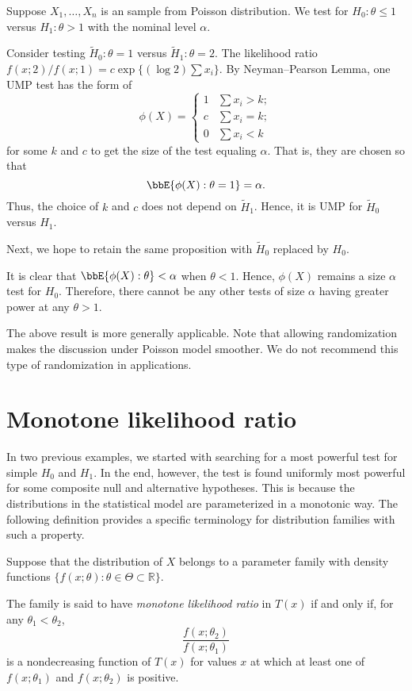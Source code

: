 \begin{example}
Suppose $X_1, \ldots, X_n$ is an \iid sample from
Poisson distribution. We test for $H_0: \theta \leq 1$ versus $H_1: \theta > 1$
with the nominal level $\alpha$.

Consider testing $\tilde H_0: \theta = 1$ versus $\tilde H_1: \theta = 2$.
The likelihood ratio  $f(x; 2)/f(x; 1) = c \exp\{  (\log 2) \sum x_i\}$.
By Neyman--Pearson Lemma, one UMP test has the form of
\[
\phi(X) = 
\left \{
\begin{array}{ll}
1 & \sum x_i > k;\\
c & \sum x_i = k;\\
0 & \sum x_i < k
\end{array}
\right .
\]
for some $k$ and $c$ to get the size of the test equaling $\alpha$.
That is, they are chosen so that
\[
\bbE \{ \phi(X): \theta = 1\} = \alpha.
\]
Thus, the choice of $k$ and $c$ does not depend on $\tilde H_1$.
Hence, it is UMP for $\tilde H_0$ versus $H_1$.


Next, we hope to retain the same proposition
with $\tilde H_0$ replaced by $H_0$.

It is clear that $\bbE \{ \phi(X): \theta\} < \alpha$ when $\theta < 1$.
Hence, $\phi(X)$ remains a size $\alpha$ test for $H_0$.
Therefore, there cannot be any other tests of size $\alpha$
having greater power at any $\theta > 1$.
\end{example}

The above result is more generally applicable.
Note that allowing randomization makes the discussion under Poisson
model smoother. We do not recommend this type of randomization
in applications.

\section{Monotone likelihood ratio}

In two previous examples, we started with searching for a most
powerful test for simple $H_0$ and $H_1$. In the end, however,
the test is found uniformly most powerful for some composite
null and alternative hypotheses. This is because the distributions
in the statistical model are parameterized in a monotonic way.
The following definition provides a specific terminology for
distribution families with such a property.

\begin{defi}
Suppose that the distribution of $X$ belongs to
a parameter family with density functions 
$\{f(x; \theta): \theta \in \Theta \subset \mathbb{R}\}$.

The family is said to have {\it monotone likelihood ratio} in $T(x)$
if and only if, for any $\theta_1 < \theta_2$,
\[
\frac{f(x; \theta_2)}{f(x; \theta_1)}
\]
is a nondecreasing function of $T(x)$ for values
$x$ at which at least one of $f(x; \theta_1)$ and $f(x; \theta_2)$
is positive.
\end{defi}

